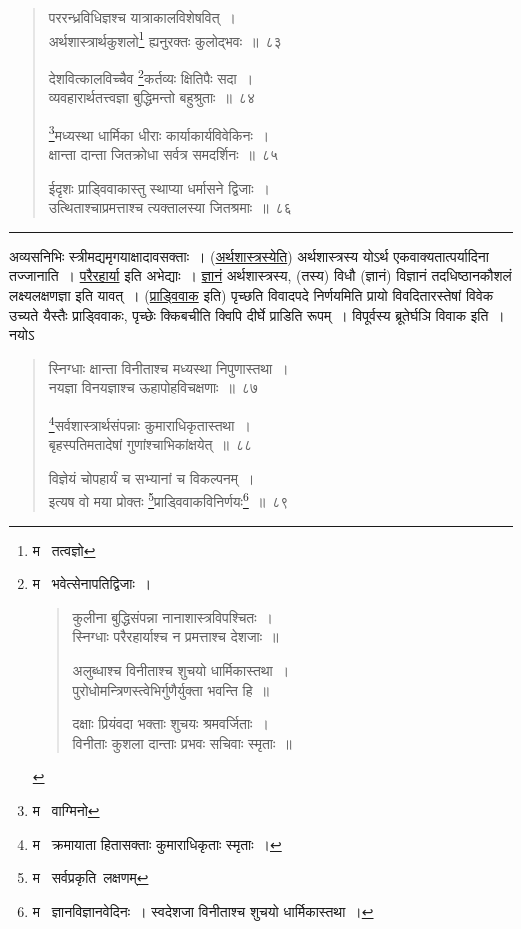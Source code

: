 \documentclass[11pt, openany]{book}
\begin{document}
\begin{quote}
{\na पररन्ध्रविधिज्ञश्च यात्राकालविशेषवित्~।\\
अर्थशास्त्रार्थकुशलो\renewcommand{\thefootnote}{1}\footnote{म \textendash\  तत्वज्ञो} ह्यनुरक्तः कुलोद्भवः~॥~८३

देशवित्कालविच्चैव \renewcommand{\thefootnote}{2}\footnote{म \textendash\  भवेत्सेनापतिद्विजाः~। 
\begin{quote}
{\qt कुलीना बुद्धिसंपन्ना नानाशास्त्रविपश्चितः~।\\
 स्निग्धाः परैरहार्याश्च न प्रमत्ताश्च देशजाः~॥

 अलुब्धाश्च विनीताश्च शुचयो धार्मिकास्तथा~।\\
 पुरोधोमन्त्रिणस्त्वेभिर्गुणैर्युक्ता भवन्ति हि~॥

 दक्षाः प्रियंवदा भक्ताः शुचयः श्रमवर्जिताः~।\\
 विनीताः कुशला दान्ताः प्रभवः सचिवाः स्मृताः~॥}
\end{quote}}कर्तव्यः क्षितिपैः सदा~।\\
व्यवहारार्थतत्त्वज्ञा बुद्धिमन्तो बहुश्रुताः~॥~८४

\renewcommand{\thefootnote}{3}\footnote{म \textendash\  वाग्मिनो}मध्यस्था धार्मिका धीराः कार्याकार्यविवेकिनः~।\\
क्षान्ता दान्ता जितक्रोधा सर्वत्र समदर्शिनः~॥~८५

ईदृशः प्राड्विवाकास्तु स्थाप्या धर्मासने द्विजाः~।\\
उत्थिताश्चाप्रमत्ताश्च त्यक्तालस्या जितश्रमाः~॥~८६}
\end{quote}

\hrule

\vspace{2mm}
\noindent
अव्यसनिभिः स्त्रीमद्यमृगयाक्षादावसक्ताः~। (\underline{अर्थशास्त्रस्येति}) अर्थशास्त्रस्य योऽर्थ एकवाक्यतात्पर्यादिना तज्जानाति~। \underline{परैरहार्या} इति अभेद्याः~। \underline{ज्ञानं} अर्थशास्त्रस्य, (तस्य) विधौ (ज्ञानं) विज्ञानं तदधिष्ठानकौशलं लक्ष्यलक्षणज्ञा इति यावत्~। (\underline{प्राड्विवाक} इति) पृच्छति विवादपदे निर्णयमिति प्रायो विवदितारस्तेषां विवेक उच्यते यैस्तैः प्राड्विवाकः, पृच्छेः क्किबचीति क्विपि दीर्घे प्राडिति रूपम्~। विपूर्वस्य ब्रूतेर्घञि विवाक इति~। नयोऽ\textendash

\newpage

\begin{quote}
{\na स्निग्धाः क्षान्ता विनीताश्च मध्यस्था निपुणास्तथा~।\\
नयज्ञा विनयज्ञाश्च ऊहापोहविचक्षणाः~॥~८७

\renewcommand{\thefootnote}{1}\footnote{म \textendash\  क्रमायाता हितासक्ताः कुमाराधिकृताः स्मृताः~।}सर्वशास्त्रार्थसंपन्नाः कुमाराधिकृतास्तथा~।\\
बृहस्पतिमतादेषां गुणांश्चाभिकांक्षयेत्~॥~८८

विज्ञेयं चोपहार्यं च सभ्यानां च विकल्पनम्~।\\
इत्यष वो मया प्रोक्तः \renewcommand{\thefootnote}{2}\footnote{म \textendash\  सर्वप्रकृति\textendash\ लक्षणम्}प्राड्विवाकविनिर्णयः\renewcommand{\thefootnote}{3}\footnote{म \textendash\  ज्ञानविज्ञानवेदिनः~। स्वदेशजा विनीताश्च शुचयो धार्मिकास्तथा~।}~॥~८९}
\end{quote}
\end{document}
